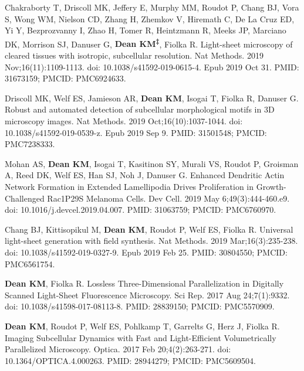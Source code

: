 \begin{etaremune}
\item Chakraborty T, Driscoll MK, Jeffery E, Murphy MM, Roudot P, Chang BJ, Vora S, Wong WM, Nielson CD, Zhang H, Zhemkov V, Hiremath C, De La Cruz ED, Yi Y, Bezprozvanny I, Zhao H, Tomer R, Heintzmann R, Meeks JP, Marciano DK, Morrison SJ, Danuser G, \textbf{Dean KM\textsuperscript{‡}}, Fiolka R. Light-sheet microscopy of cleared tissues with isotropic, subcellular resolution. Nat Methods. 2019 Nov;16(11):1109-1113. doi: 10.1038/s41592-019-0615-4. Epub 2019 Oct 31. PMID: 31673159; PMCID: PMC6924633.

\item Driscoll MK, Welf ES, Jamieson AR, \textbf{Dean KM}, Isogai T, Fiolka R, Danuser G. Robust and automated detection of subcellular morphological motifs in 3D microscopy images. Nat Methods. 2019 Oct;16(10):1037-1044. doi: 10.1038/s41592-019-0539-z. Epub 2019 Sep 9. PMID: 31501548; PMCID: PMC7238333.

\item Mohan AS, \textbf{Dean KM}, Isogai T, Kasitinon SY, Murali VS, Roudot P, Groisman A, Reed DK, Welf ES, Han SJ, Noh J, Danuser G. Enhanced Dendritic Actin Network Formation in Extended Lamellipodia Drives Proliferation in Growth-Challenged Rac1P29S Melanoma Cells. Dev Cell. 2019 May 6;49(3):444-460.e9. doi: 10.1016/j.devcel.2019.04.007. PMID: 31063759; PMCID: PMC6760970.

\item Chang BJ, Kittisopikul M, \textbf{Dean KM}, Roudot P, Welf ES, Fiolka R. Universal light-sheet generation with field synthesis. Nat Methods. 2019 Mar;16(3):235-238. doi: 10.1038/s41592-019-0327-9. Epub 2019 Feb 25. PMID: 30804550; PMCID: PMC6561754.

\item \textbf{Dean KM}, Fiolka R. Lossless Three-Dimensional Parallelization in Digitally Scanned Light-Sheet Fluorescence Microscopy. Sci Rep. 2017 Aug 24;7(1):9332. doi: 10.1038/s41598-017-08113-8. PMID: 28839150; PMCID: PMC5570909.

\item \textbf{Dean KM}, Roudot P, Welf ES, Pohlkamp T, Garrelts G, Herz J, Fiolka R. Imaging Subcellular Dynamics with Fast and Light-Efficient Volumetrically Parallelized Microscopy. Optica. 2017 Feb 20;4(2):263-271. doi: 10.1364/OPTICA.4.000263. PMID: 28944279; PMCID: PMC5609504.


\end{etaremune}
